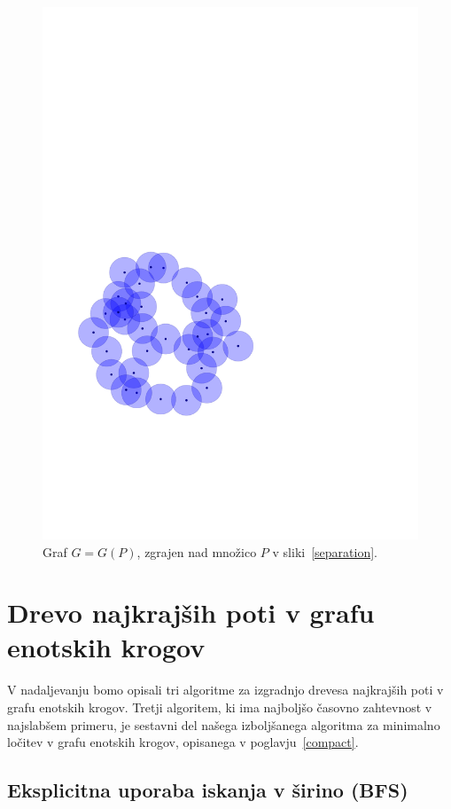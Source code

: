 \documentclass[a4paper, 12pt]{book}
\begin{document}
\begin{figure}[htp]
\centerline{\includegraphics[scale=0.6,page=5]{pics/unitdisks.pdf}}
\caption{Graf $G=G(P)$, zgrajen nad množico $P$ v sliki~\ref{separation}.}
\label{gdisks}
\end{figure}

\section{Drevo najkrajših poti v grafu enotskih krogov}
V nadaljevanju bomo opisali tri algoritme za izgradnjo drevesa najkrajših poti v grafu enotskih krogov. Tretji algoritem, ki ima najboljšo časovno zahtevnost v najslabšem primeru, je sestavni del našega izboljšanega algoritma za minimalno ločitev v grafu enotskih krogov, opisanega v poglavju~\ref{compact}.

\subsection{Eksplicitna uporaba iskanja v širino (BFS)}
\label{bfs-theory}
\end{document}
